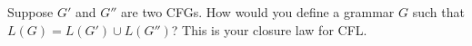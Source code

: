 Suppose $G'$ and $G''$ are two CFGs.
How would you define a grammar $G$ such that $L(G) = L(G') \cup L(G'')$?
This is your closure law for CFL.

